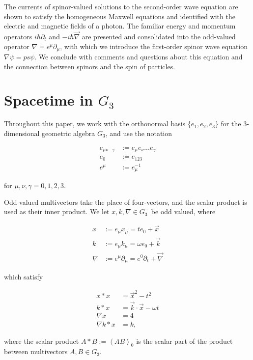\documentclass{birkjour}
\begin{document}
The currents of spinor-valued solutions to the second-order wave equation are shown to satisfy the homogeneous Maxwell equations and identified with the electric and magnetic fields of a photon. The familiar energy and momentum operators $i \hbar \partial_t$ and $-i \hbar \vec \nabla$ are presented and consolidated into the odd-valued operator $\nabla = e^\mu \partial_\mu$, with which we introduce the first-order spinor wave equation $\nabla \psi = p s \psi.$ We conclude with comments and questions about this equation and the connection between spinors and the spin of particles.

\section{Spacetime in $G_3$}

Throughout this paper, we work with the orthonormal basis $\{e_1, e_2, e_3\}$ for the 3-dimensional geometric algebra $G_3$, and use the notation 

\begin{align}
  e_{\mu \nu ... \gamma} &:= e_\mu e_\nu ... e_\gamma\\
  e_0 &:= e_{123}\\ 
  e^\mu &:= e_\mu^{-1} 
\end{align}

for $\mu, \nu, \gamma = 0,1,2,3$.

Odd valued multivectors take the place of four-vectors, and the scalar product is used as their inner product. We let $x, k, \nabla \in G_3^-$ be odd valued, where

\begin{align}
  x &:= e_\mu x_\mu = t e_0 + \vec x \\
  k &:= e_\mu k_\mu = \omega e_0 + \vec k \\
  \nabla &:= e^\mu \partial_\mu = e^0 \partial_t + \vec \nabla
\end{align}

which satisfy

\begin{align}
  x * x &= \vec x^2 - t^2\\
  k*x &= \vec k \cdot \vec x - \omega t\\ 
  \nabla x &= 4 \\
  \nabla k * x &= k,
\end{align}

where the scalar product $A * B := \left< AB \right>_0$ is the scalar part of the product between multivectors $A, B \in G_3$.
\end{document}
